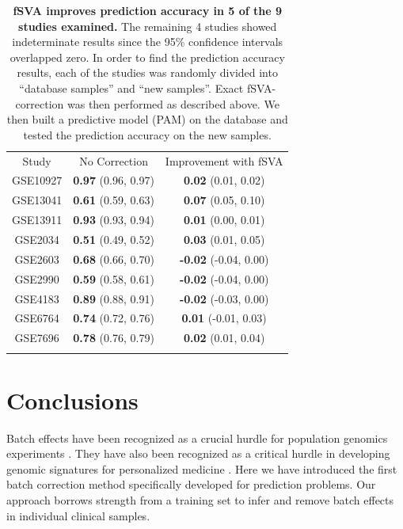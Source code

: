 \documentclass[letterpaper,12pt]{article}\usepackage[]{graphicx}\usepackage[]{color}
\begin{document}
\begin{table}
\begin{center}
\begin{tabular}{ccc}
   & \\
  \hline
Study & No Correction &  Improvement with fSVA \\
  \hline
GSE10927 & \textbf{0.97}
				  (0.96, 0.97) 
		 & \textbf{0.02}
				  (0.01, 0.02)  \\
GSE13041 & \textbf{0.61}
				  (0.59, 0.63) 
		 & \textbf{0.07}
				  (0.05, 0.10)  \\
GSE13911 & \textbf{0.93}
				  (0.93, 0.94) 
		 & \textbf{0.01}
				  (0.00, 0.01)  \\
GSE2034  & \textbf{0.51}
				  (0.49, 0.52) 
		 & \textbf{0.03}
				  (0.01, 0.05)  \\
GSE2603  & \textbf{0.68}
				  (0.66, 0.70) 
		 & \textbf{-0.02}
				  (-0.04, 0.00)  \\
GSE2990  & \textbf{0.59}
				  (0.58, 0.61) 
		 & \textbf{-0.02}
				  (-0.04, 0.00)  \\
GSE4183  & \textbf{0.89}
				  (0.88, 0.91) 
		 & \textbf{-0.02}
				  (-0.03, 0.00)  \\
GSE6764  & \textbf{0.74}
				  (0.72, 0.76) 
		 & \textbf{0.01}
				  (-0.01, 0.03)  \\
GSE7696  & \textbf{0.78}
				  (0.76, 0.79) 
		 & \textbf{0.02}
				  (0.01, 0.04)  \\
\hline
 & \\
\end{tabular}
\caption{\textbf{fSVA improves prediction accuracy in 5 of the 9 studies examined.} The remaining 4 studies showed indeterminate results since the 95\% confidence intervals overlapped zero.  In order to find the prediction accuracy results, each of the studies was randomly divided into ``database samples'' and ``new samples''.  Exact fSVA-correction was then performed as described above.  We then built a predictive model (PAM) on the database and tested the prediction accuracy on the new samples.}
\end{center}
\label{studytab}
\end{table}


\section{Conclusions}

Batch effects have been recognized as a crucial hurdle for population genomics experiments \citep{Leek2010,Parker2012}. They have also been recognized as a critical hurdle in developing genomic signatures for personalized medicine \citep{Micheel2012}. Here we have introduced the first batch correction method specifically developed for prediction problems. Our approach borrows strength from a training set to infer and remove batch effects in individual clinical samples. 
\end{document}
